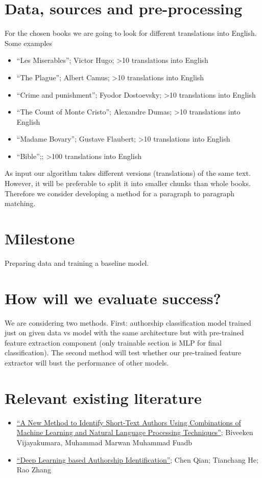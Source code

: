 \documentclass{article}
\begin{document}
\section{Data, sources and pre-processing}
For the chosen books we are going to look for different translations into English. Some examples
\begin{itemize}
    \item ``Les Miserables''; Victor Hugo; >10 translations into English
    \item ``The Plague''; Albert Camus; >10 translations into English
    \item ``Crime and punishment''; Fyodor Dostoevsky; >10 translations into English
    \item ``The Count of Monte Cristo''; Alexandre Dumas; >10 translations into English
    \item ``Madame Bovary''; Gustave Flaubert; >10 translations into English
    \item ``Bible'';; >100 translations into English
\end{itemize}
As input our algorithm takes different versions (translations) of the same text. However, it will be preferable to split it into smaller chunks than whole books. Therefore we consider developing a method for a paragraph to paragraph matching.

\section{Milestone}
Preparing data and training a baseline model.

\section{How will we evaluate success?}
We are considering two methods. First: authorship classification model trained just on given data vs model with the same architecture but with pre-trained feature extraction component (only trainable section is MLP for final classification). The second method will test whether our pre-trained feature extractor will bust the performance of other models.

\section{Relevant existing literature}
\begin{itemize}
    \item \href{https://reader.elsevier.com/reader/sd/pii/S1877050919313791?token=E79C223624500BFB669FF9BACC0506AA22D90F8B15E80D1602653D05322F0E82EFDEB89C5B0597F23413FAE3A29961F2&originRegion=eu-west-1&originCreation=20220524183711}{``A New Method to Identify Short-Text Authors Using Combinations of Machine Learning and Natural Language Processing Techniques''}; Biveeken Vijayakumara, Muhammad Marwan Muhammad Fuadb
    \item \href{https://web.stanford.edu/class/archive/cs/cs224n/cs224n.1174/reports/2760185.pdf}{``Deep Learning based Authorship Identification''}; Chen Qian; Tianchang He; Rao Zhang
\end{itemize}
\end{document}
